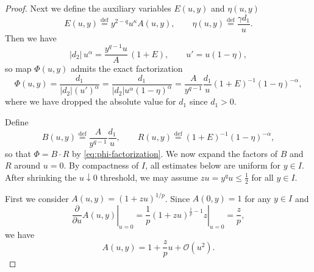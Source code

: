\documentclass[10pt,a4paper]{amsart}
\newcommand{\defi}{\stackrel{\mathrm{\scriptscriptstyle def}}{=}}
\begin{document}
\begin{proof}
    Next we define the auxiliary variables $E(u,y)$ and $\eta(u,y)$
    \[
        E(u,y)\defi y^{2-q}u^\kappa A(u,y),
        \qquad
        \eta(u,y)\defi \frac{\gamma d_1}{u}.
    \]
    Then we have
    \[
        |d_2|\,u^\alpha = \frac{y^{q-1}u}{A}\,(1+E),
        \qquad
        u'=u(1-\eta),
    \]
    so map $\Phi(u,y)$ admits the exact factorization
    \begin{equation}\label{eq:phi-factorization}
        \Phi(u,y) = \frac{d_1}{|d_2|(u')^\alpha}
        = \frac{d_1}{|d_2|u^\alpha(1-\eta)^\alpha}
        = \frac{A}{y^{q-1}}\frac{d_1}{u}(1+E)^{-1} (1-\eta)^{-\alpha},
    \end{equation}
    where we have dropped the absolute value for $d_1$ since $d_1 > 0$.

    Define
    \[
        B(u,y)\defi \frac{A}{y^{q-1}}\frac{d_1}{u},
        \qquad
        R(u,y)\defi (1+E)^{-1}(1-\eta)^{-\alpha},
    \]
    so that $\Phi=B\cdot R$ by \eqref{eq:phi-factorization}.
    We now expand the factors of $B$ and $R$ around $u=0$. By compactness of $I$,
    all estimates below are uniform for $y\in I$.
    After shrinking the $u \downarrow 0$ threshold, we may assume $zu=y^q u \leq \frac12$ for all $y \in I$.

    First we consider $A(u,y) = (1+zu)^{1/p}$.
    Since $A(0,y) = 1$ for any $y \in I$ and
    \begin{equation}
        \left.\frac{\partial }{\partial u} A(u,y)\right|_{u=0}
        = \left.\frac{1}{p} (1+zu)^{\frac 1p -1}z\right|_{u=0}
        = \frac{z}{p},
        \label{eq:A-deriv-1}
    \end{equation}
    we have
    \begin{equation}
        \label{eq:A-u-expand}
        A(u,y) = 1 + \frac{z}{p} u + \mathcal{O}(u^2).
    \end{equation}


\end{proof}
\end{document}
